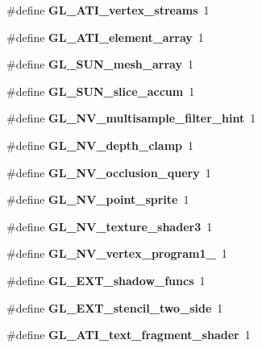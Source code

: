 \begin{DoxyCompactItemize}
\item 
\#define {\bfseries G\+L\+\_\+\+A\+T\+I\+\_\+vertex\+\_\+streams}~1\label{_s_d_l__opengl_8h_aa44234dbeb434adfee21c0b6a4d3b481}

\item 
\#define {\bfseries G\+L\+\_\+\+A\+T\+I\+\_\+element\+\_\+array}~1\label{_s_d_l__opengl_8h_af33b561e10a18461db5b3fb8db8c9567}

\item 
\#define {\bfseries G\+L\+\_\+\+S\+U\+N\+\_\+mesh\+\_\+array}~1\label{_s_d_l__opengl_8h_a94e19df9f43ec8befe7d3d990e4f4e1b}

\item 
\#define {\bfseries G\+L\+\_\+\+S\+U\+N\+\_\+slice\+\_\+accum}~1\label{_s_d_l__opengl_8h_a59588c571d0add960e2b3a7992a43164}

\item 
\#define {\bfseries G\+L\+\_\+\+N\+V\+\_\+multisample\+\_\+filter\+\_\+hint}~1\label{_s_d_l__opengl_8h_af7d93fe994271cab278f5ae18aa9cfd6}

\item 
\#define {\bfseries G\+L\+\_\+\+N\+V\+\_\+depth\+\_\+clamp}~1\label{_s_d_l__opengl_8h_a223ddd63e5c2f5320ff8319bd1ce65f3}

\item 
\#define {\bfseries G\+L\+\_\+\+N\+V\+\_\+occlusion\+\_\+query}~1\label{_s_d_l__opengl_8h_a2ba03b49496dd6cb35150e4492ec162a}

\item 
\#define {\bfseries G\+L\+\_\+\+N\+V\+\_\+point\+\_\+sprite}~1\label{_s_d_l__opengl_8h_a645332a460a89939ae7034f3efb4dccc}

\item 
\#define {\bfseries G\+L\+\_\+\+N\+V\+\_\+texture\+\_\+shader3}~1\label{_s_d_l__opengl_8h_ae04906a37dc1fd35f50ffa0b99c39243}

\item 
\#define {\bfseries G\+L\+\_\+\+N\+V\+\_\+vertex\+\_\+program1\+\_}~1\label{_s_d_l__opengl_8h_a0052ad4aff6e88f423b21774890268a8}

\item 
\#define {\bfseries G\+L\+\_\+\+E\+X\+T\+\_\+shadow\+\_\+funcs}~1\label{_s_d_l__opengl_8h_a8bb417980938dbea3f0123c6369745fa}

\item 
\#define {\bfseries G\+L\+\_\+\+E\+X\+T\+\_\+stencil\+\_\+two\+\_\+side}~1\label{_s_d_l__opengl_8h_ade6db01171ace765e3a73a252484113e}

\item 
\#define {\bfseries G\+L\+\_\+\+A\+T\+I\+\_\+text\+\_\+fragment\+\_\+shader}~1\label{_s_d_l__opengl_8h_aaea8da937df0545fe4fce756eb2fcdea}


\end{DoxyCompactItemize}
